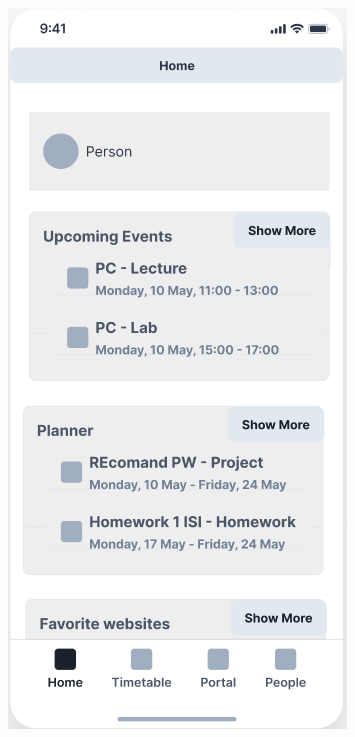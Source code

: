 \begin{figure}[!ht]
    \centering
    \begin{minipage}[b]{0.45\textwidth}
        \captionsetup{justification=centering}
        \includegraphics[width=\textwidth]{figures/wf/image15.png}

\end{minipage}
\end{figure}
